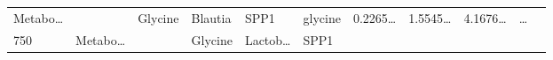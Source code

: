 \documentclass[
]{article}
\begin{document}
\begin{longtable}[]{@{}lllllllllll@{}}
\begin{minipage}[t]{0.07\columnwidth}
Metabo\ldots{}\strut
\end{minipage} & \begin{minipage}[t]{0.07\columnwidth}\raggedright
\strut
\end{minipage} & \begin{minipage}[t]{0.09\columnwidth}\raggedright
Glycine\strut
\end{minipage} & \begin{minipage}[t]{0.07\columnwidth}\raggedright
Blautia\strut
\end{minipage} & \begin{minipage}[t]{0.07\columnwidth}\raggedright
SPP1\strut
\end{minipage} & \begin{minipage}[t]{0.09\columnwidth}\raggedright
glycine\strut
\end{minipage} & \begin{minipage}[t]{0.07\columnwidth}\raggedright
0.2265\ldots{}\strut
\end{minipage} & \begin{minipage}[t]{0.07\columnwidth}\raggedright
1.5545\ldots{}\strut
\end{minipage} & \begin{minipage}[t]{0.07\columnwidth}\raggedright
4.1676\ldots{}\strut
\end{minipage} & \begin{minipage}[t]{0.03\columnwidth}\raggedright
\ldots{}\strut
\end{minipage}\tabularnewline
\begin{minipage}[t]{0.03\columnwidth}\raggedright
750\strut
\end{minipage} & \begin{minipage}[t]{0.07\columnwidth}\raggedright
Metabo\ldots{}\strut
\end{minipage} & \begin{minipage}[t]{0.07\columnwidth}\raggedright
\strut
\end{minipage} & \begin{minipage}[t]{0.09\columnwidth}\raggedright
Glycine\strut
\end{minipage} & \begin{minipage}[t]{0.07\columnwidth}\raggedright
Lactob\ldots{}\strut
\end{minipage} & \begin{minipage}[t]{0.07\columnwidth}\raggedright
SPP1\strut
\end{minipage} & \begin{minipage}[t]{0.09\columnwidth}\raggedright

\end{minipage}
\end{longtable}
\end{document}
